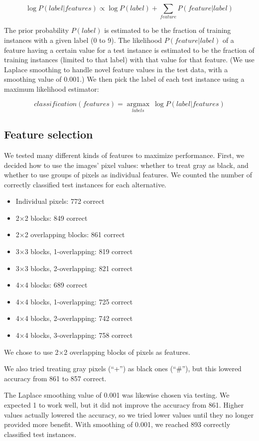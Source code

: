 \documentclass[11pt]{article}
\begin{document}
$$\log P(label|features) \propto \log P(label) + \sum_{feature} P(feature|label)$$

The prior probability $P(label)$ is estimated to be the fraction of training instances
with a given label (0 to 9). The likelihood $P(feature|label)$ of a feature having a
certain value for a test instance is estimated to be the fraction of training instances
(limited to that label) with that value for that feature. (We use Laplace smoothing to
handle novel feature values in the test data, with a smoothing value of 0.001.) We then
pick the label of each test instance using a maximum likelihood estimator:

$$classification(features) = \underset{labels}{\operatorname{argmax}} \ \log P(label|features)$$

\subsection{Feature selection}

We tested many different kinds of features to maximize performance. First, we decided
how to use the images' pixel values: whether to treat gray as black, and whether to use
groups of pixels as individual features. We counted the number of correctly classified
test instances for each alternative.

\begin{itemize}[noitemsep]
\item Individual pixels: 772 correct
\item 2$\times$2 blocks: 849 correct
\item 2$\times$2 overlapping blocks: 861 correct
\item 3$\times$3 blocks, 1-overlapping: 819 correct
\item 3$\times$3 blocks, 2-overlapping: 821 correct
\item 4$\times$4 blocks: 689 correct
\item 4$\times$4 blocks, 1-overlapping: 725 correct
\item 4$\times$4 blocks, 2-overlapping: 742 correct
\item 4$\times$4 blocks, 3-overlapping: 758 correct
\end{itemize}

We chose to use 2$\times$2 overlapping blocks of pixels as features.

We also tried treating gray pixels (``+'') as black ones (``\#''), but this lowered
accuracy from 861 to 857 correct.

The Laplace smoothing value of 0.001 was likewise chosen via testing. We expected 1 to
work well, but it did not improve the accuracy from 861. Higher values actually lowered
the accuracy, so we tried lower values until they no longer provided more benefit. With
smoothing of 0.001, we reached 893 correctly classified test instances.
\end{document}

